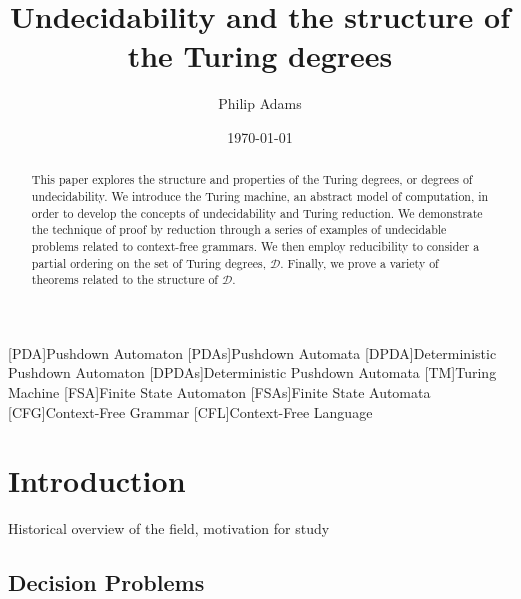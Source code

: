 \documentclass[psamsfonts]{amsart}
\title{Undecidability and the structure of the Turing degrees}
\author{Philip Adams}
\date{\today}
\theoremstyle{definition}
\theoremstyle{remark}
\numberwithin{equation}{section}
\begin{document}
\begin{abstract}

  This paper explores the structure and properties of the Turing degrees, or
  degrees of undecidability. We introduce the Turing machine, an abstract model
  of computation, in order to develop the concepts of undecidability and Turing
  reduction. We demonstrate the technique of proof by reduction through a series
  of examples of undecidable problems related to context-free grammars. We then
  employ reducibility to consider a partial ordering on the set of Turing degrees, $\mathcal{D}$. Finally, we prove a variety of theorems
  related to the structure of $\mathcal{D}$.
  
\end{abstract}

\maketitle


\tableofcontents
\begin{acronym}
  [PDA]{Pushdown Automaton}
  [PDAs]{Pushdown Automata}
  [DPDA]{Deterministic Pushdown Automaton}
  [DPDAs]{Deterministic Pushdown Automata}
  [TM]{Turing Machine}
  [FSA]{Finite State Automaton}
  [FSAs]{Finite State Automata}
  [CFG]{Context-Free Grammar}
  [CFL]{Context-Free Language}
\end{acronym}

\section{Introduction}
Historical overview of the field, motivation for study
\cite{ambos-spies06:_degrees_unsol}
\cite{soare16_turin_comput}
\cite{soare1999history}
\cite{lerman16:_degrees_unsol}
\subsection{Decision Problems}
\end{document}

